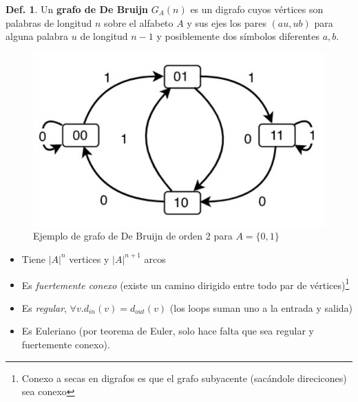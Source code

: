 \documentclass{report}
\theoremstyle{definition} %
\newtheorem{definition}{Def.}[chapter]
\begin{document}
\begin{definition}
    Un \textbf{grafo de De Bruijn} $G_A(n)$ es un digrafo cuyos vértices son
    palabras de longitud $n$ sobre el alfabeto $A$ y sus ejes los pares $(au,
    ub)$ para alguna palabra $u$ de longitud $n - 1$ y posiblemente dos símbolos
    diferentes $a, b$.

    \begin{figure}[H]
        \centering
        \includegraphics[scale=0.3]{img/2_de_brujin_01.png}
        \caption{Ejemplo de grafo de De Bruijn de orden 2 para $A = \{0, 1\}$}
    \end{figure}
    
    \begin{itemize}
        \item Tiene $|A|^n$ vertices y $|A|^{n+1}$ arcos
        \item Es \textit{fuertemente conexo} (existe un camino dirigido entre
        todo par de vértices)\footnote{Conexo a secas en digrafos es que el grafo
        subyacente (sacándole direcicones) sea conexo}
        \item Es \textit{regular}, $\forall v. d_{in}(v) = d_{out}(v)$ (los
        loops suman uno a la entrada y salida)
        \item Es Euleriano (por teorema de Euler, solo hace falta que sea
        regular y fuertemente conexo).
    \end{itemize}
\end{definition}
\end{document}
